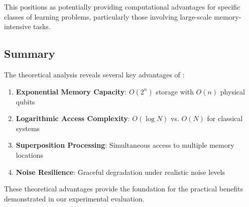 This positions \qmann as potentially providing computational advantages for specific classes of learning problems, particularly those involving large-scale memory-intensive tasks.

\subsection{Summary}

The theoretical analysis reveals several key advantages of \qmann:

\begin{enumerate}
    \item \textbf{Exponential Memory Capacity}: $O(2^n)$ storage with $O(n)$ physical qubits
    \item \textbf{Logarithmic Access Complexity}: $O(\log N)$ vs. $O(N)$ for classical systems
    \item \textbf{Superposition Processing}: Simultaneous access to multiple memory locations
    \item \textbf{Noise Resilience}: Graceful degradation under realistic noise levels
\end{enumerate}

These theoretical advantages provide the foundation for the practical benefits demonstrated in our experimental evaluation.
